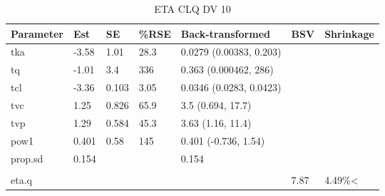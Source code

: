 \begin{table}
\centering\centering
\caption{ETA CLQ DV 10}
\centering
\fontsize{8}{10}\selectfont
\begin{tabular}[t]{lllllll}
\toprule
\textbf{Parameter} & \textbf{Est} & \textbf{SE} & \textbf{\%RSE} & \textbf{Back-transformed} & \textbf{BSV} & \textbf{Shrinkage}\\
\midrule
tka & -3.58 & 1.01 & 28.3 & 0.0279 (0.00383, 0.203) &  & \\
\midrule
tq & -1.01 & 3.4 & 336 & 0.363 (0.000462, 286) &  & \\
\midrule
tcl & -3.36 & 0.103 & 3.05 & 0.0346 (0.0283, 0.0423) &  & \\
\midrule
tvc & 1.25 & 0.826 & 65.9 & 3.5 (0.694, 17.7) &  & \\
\midrule
tvp & 1.29 & 0.584 & 45.3 & 3.63 (1.16, 11.4) &  & \\
\midrule
pow1 & 0.401 & 0.58 & 145 & 0.401 (-0.736, 1.54) &  & \\
\midrule
prop.sd & 0.154 &  &  & 0.154 &  & \\
\midrule\\
eta.q &  &  &  &  & 7.87 & 4.49\%<\\
\bottomrule
\end{tabular}
\end{table}